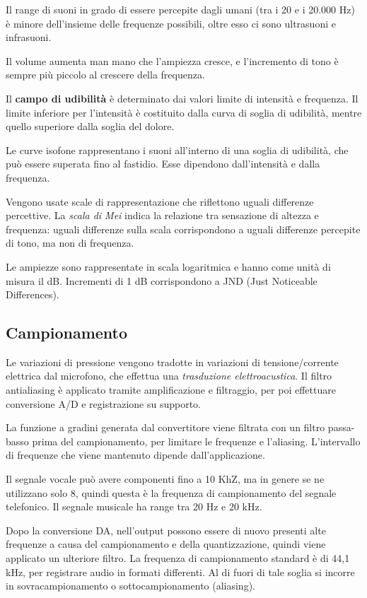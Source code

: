 Il range di suoni in grado di essere percepite dagli umani (tra i 20 e i 20.000 Hz) è minore dell'insieme delle frequenze possibili, oltre esso ci sono ultrasuoni e infrasuoni. 

Il volume aumenta man mano che l'ampiezza cresce, e l'incremento di tono è sempre più piccolo al crescere della frequenza.

Il \textbf{campo di udibilità} è determinato dai valori limite di intensità e frequenza. Il limite inferiore per l'intensità è costituito dalla curva di soglia di udibilità, mentre quello superiore dalla soglia del dolore. 

Le curve isofone rappresentano i suoni all'interno di una soglia di udibilità, che può essere superata fino al fastidio. Esse dipendono dall'intensità e dalla frequenza.

Vengono usate scale di rappresentazione che riflettono uguali differenze percettive. La \textit{scala di Mei} indica la relazione tra sensazione di altezza e frequenza: uguali differenze sulla scala corrispondono a uguali differenze percepite di tono, ma non di frequenza.

Le ampiezze sono rappresentate in scala logaritmica e hanno come unità di misura il dB. Incrementi di 1 dB corrispondono a JND (Just Noticeable Differences).

\subsection{Campionamento}
Le variazioni di pressione vengono tradotte in variazioni di tensione/corrente elettrica dal microfono, che effettua una \textit{trasduzione elettroacustica}. Il filtro antialiasing è applicato tramite amplificazione e filtraggio, per poi effettuare conversione A/D e registrazione su supporto.

La funzione a gradini generata dal convertitore viene filtrata con un filtro passa-basso prima del campionamento, per limitare le frequenze e l'aliasing. L'intervallo di frequenze che viene mantenuto dipende dall'applicazione.

Il segnale vocale può avere componenti fino a 10 KhZ, ma in genere se ne utilizzano solo 8, quindi questa è la frequenza di campionamento del segnale telefonico. Il segnale musicale ha range tra 20 Hz e 20 kHz.

Dopo la conversione DA, nell'output possono essere di nuovo presenti alte frequenze a causa del campionamento e della quantizzazione, quindi viene applicato un ulteriore filtro. La frequenza di campionamento standard è di 44,1 kHz, per registrare audio in formati differenti. Al di fuori di tale soglia si incorre in sovracampionamento o sottocampionamento (aliasing). 


